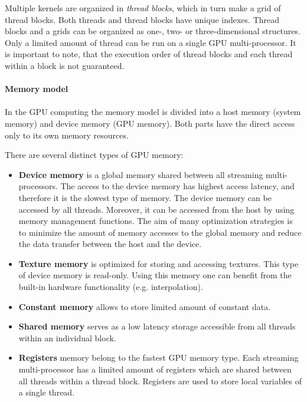 Multiple kernels are organized in \textit{thread blocks}, which in turn make a grid of thread blocks. Both threads and thread blocks have unique indexes.  Thread blocks and a grids can be organized as one-, two- or three-dimensional structures.  Only a limited amount of thread can be run on a single GPU multi-processor. It is important to note, that the execution order of thread blocks and each thread within a block is not guaranteed.  
\\
\\
\textbf{Memory model}
\\
\\
In the GPU computing the memory model is divided into a host memory (system memory) and device memory (GPU memory).
Both parts have the direct access only to its own memory resources.  

There are several distinct types of GPU memory:
\begin{itemize}
	\item \textbf{Device memory} is a global memory shared between all streaming multi-processors. The access to the device memory has highest access latency, and therefore it is the slowest type of memory. The device memory can be accessed by all threads. Moreover, it can be accessed from the host by using memory management functions. The aim of many optimization strategies is to minimize the amount of memory accesses to the global memory and reduce the data transfer between the host and the device.  
	
	\item \textbf{Texture memory} is optimized for storing and accessing textures. This type of device memory is read-only.
	Using this memory one can benefit from the built-in hardware functionality (e.g. interpolation).
	
	\item \textbf{Constant memory} allows to store limited amount of constant data.
	
	\item \textbf{Shared memory} serves as a low latency storage accessible from all threads within an individual block. 
	
	\item \textbf{Registers} memory belong to the fastest GPU memory type. Each streaming multi-processor has a limited amount of registers which are shared between all threads within a thread block. Registers are used to store local variables of a single thread. 
\end{itemize}

